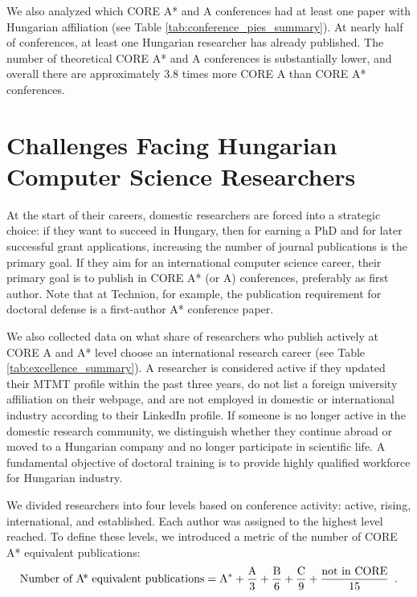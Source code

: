 \documentclass[12pt,a4paper]{article}
\begin{document}
We also analyzed which CORE A\!* and A conferences had at least one paper with Hungarian affiliation (see Table \ref{tab:conference_pies_summary}). At nearly half of conferences, at least one Hungarian researcher has already published. The number of theoretical CORE A\!* and A conferences is substantially lower, and overall there are approximately 3.8 times more CORE A than CORE A\!* conferences.



\section{Challenges Facing Hungarian Computer Science Researchers}

At the start of their careers, domestic researchers are forced into a strategic choice: if they want to succeed in Hungary, then for earning a PhD and for later successful grant applications, increasing the number of journal publications is the primary goal. If they aim for an international computer science career, their primary goal is to publish in CORE A\!* (or A) conferences, preferably as first author. Note that at Technion, for example, the publication requirement for doctoral defense is a first-author A\!* conference paper.

We also collected data on what share of researchers who publish actively at CORE A and A\!* level choose an international research career (see Table \ref{tab:excellence_summary}).
A researcher is considered active if they updated their MTMT profile within the past three years, do not list a foreign university affiliation on their webpage, and are not employed in domestic or international industry according to their LinkedIn profile. If someone is no longer active in the domestic research community, we distinguish whether they continue abroad or moved to a Hungarian company and no longer participate in scientific life. A fundamental objective of doctoral training is to provide highly qualified workforce for Hungarian industry.

We divided researchers into four levels based on conference activity: active, rising, international, and established. Each author was assigned to the highest level reached. To define these levels, we introduced a metric of the number of CORE A\!* equivalent publications:
\begin{equation}
\textrm{Number of A\!* equivalent publications} = \mathrm{A^*} + \frac{\mathrm{A}}{3} + \frac{\mathrm{B}}{6} + \frac{\mathrm{C}}{9} + \frac{\textrm{not in CORE}}{15} \enspace .
\label{eq:weights1}
\end{equation}
\end{document}
